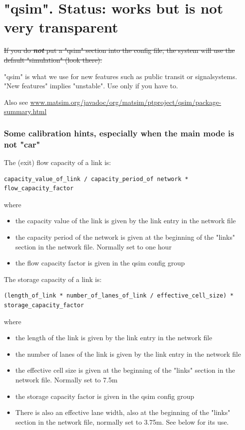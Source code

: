 \vfill\eject
\section{"qsim". Status: works but is not very transparent}

\sout{If you do \textbf{\emph{not}} put a "qsim" section into the config file, the system will use the default "simulation" (look there).}

"qsim"  is what we use for new features such as public transit or  signalsystems. "New features" implies "unstable". Use only  if you have to.

Also see \href{http://www.matsim.org/javadoc/org/matsim/ptproject/qsim/package-summary.html}{www.matsim.org/javadoc/org/matsim/ptproject/qsim/package-summary.html}

\subsubsection{Some calibration hints, especially when the main mode is not "car"}

The (exit) flow capacity of a link is:
\begin{verbatim}
capacity_value_of_link / capacity_period_of network * flow_capacity_factor

\end{verbatim}

where
\begin{itemize}
	\item the capacity value of the link is given by the link entry in the network file
	\item the  capacity period of the network is given at the beginning of the "links"  section in the network file. Normally set to one hour
	\item the flow capacity factor is given in the qsim config group
\end{itemize}

The storage capacity of a link is:
\begin{verbatim}
(length_of_link * number_of_lanes_of_link / effective_cell_size) * storage_capacity_factor

\end{verbatim}

where
\begin{itemize}
	\item the length of the link is given by the link entry in the network file
	\item the number of lanes of the link is given by the link entry in the network file
	\item the effective cell size is given at the beginning of the "links" section in the network file. Normally set to 7.5m
	\item the storage capacity factor is given in the qsim config group
	\item There  is also an effective lane width, also at the beginning of the "links"  section in the network file, normally set to 3.75m. See below for  its use.
\end{itemize}


